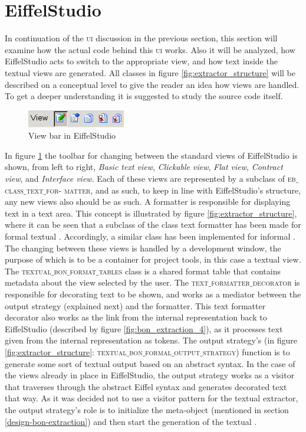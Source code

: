 \section{EiffelStudio}
\label{implementation_eiffelstudio}
In continuation of the \textsc{ui} discussion in the previous section, this section will examine how the actual code behind this \textsc{ui} works. Also it will be analyzed, how EiffelStudio acts to switch to the appropriate view, and how text inside the textual views are generated. All classes in figure \ref{fig:extractor_structure} will be described on a conceptual level to give the reader an idea how views are handled. To get a deeper understanding it is suggested to study the source code itself.

\begin{figure}[H]
\centering
\includegraphics[scale=0.8]{images/es0.png}
\caption{View bar in EiffelStudio}
\label{fig:EiffelStudio0}
\end{figure}

In figure \ref{fig:EiffelStudio0} the toolbar for changing between the standard views of EiffelStudio is shown, from left to right, \textit{Basic text view}, \textit{Clickable view}, \textit{Flat view}, \textit{Contract view}, and \textit{Interface view}. Each of these views are represented by a subclass of \textsc{eb$\_$class$\_$text$\_$for- matter}, and as such, to keep in line with EiffelStudio's structure, any new views also should be as such. A formatter is responsible for displaying text in a text area. This concept is illustrated by figure \ref{fig:extractor_structure}, where it can be seen that a subclass of the class text formatter has been made for formal textual \bon. Accordingly, a similar class has been implemented for informal \bon{}. The changing between these views is handled by a development window, the purpose of which is to be a container for project tools, in this case a textual view. The \textsc{textual$\_$bon$\_$format$\_$tables} class is a shared format table that contains metadata about the view selected by the user. The \textsc{text$\_$formatter$\_$decorator} is responsible for decorating text to be shown, and works as a mediator between the output strategy (explained next) and the formatter. This text formatter decorator also works as the link from the internal representation back to EiffelStudio (described by figure \ref{fig:bon_extraction_4}), as it processes text given from the internal \bon{} representation as tokens. The output strategy's (in figure \ref{fig:extractor_structure}: \textsc{textual$\_$bon$\_$formal$\_$output$\_$strategy}) function is to generate some sort of textual output based on an abstract syntax. In the case of the views already in place in EiffelStudio, the output strategy works as a visitor that traverses through the abstract Eiffel syntax and generates decorated text that way. As it was decided not to use a visitor pattern for the textual \bon{} extractor, the output strategy's role is to initialize the meta-object (mentioned in section \ref{design-bon-extraction}) and then start the generation of the textual \bon.

